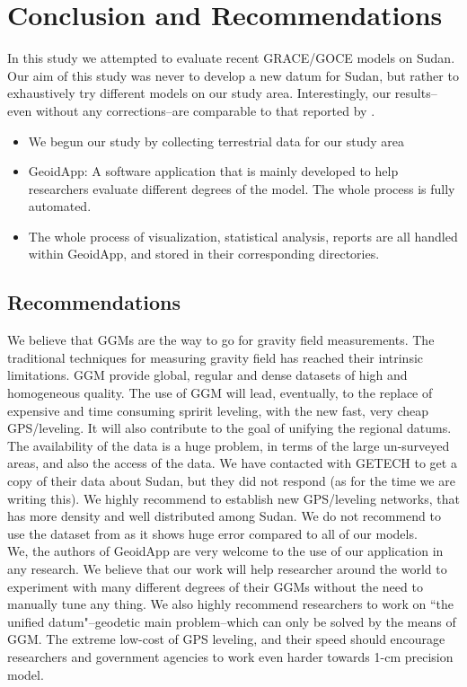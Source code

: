 \chapter{Conclusion and Recommendations}
\label{Chapter6}

In this study we attempted to evaluate recent GRACE/GOCE models on Sudan. Our aim of this study was never to develop a new datum for Sudan, but rather to exhaustively try different models on our study area. Interestingly, our results--even without any corrections--are comparable to that reported by \citep{ahmed_msc, godah}. 

\begin{itemize}
	\item We begun our study by collecting terrestrial data for our study area
	\item GeoidApp: A software application that is mainly developed to help researchers evaluate different degrees of the model. The whole process is fully automated.
	\item The whole process of visualization, statistical analysis, reports are all handled within GeoidApp, and stored in their corresponding directories.
\end{itemize}

\section{Recommendations}

We believe that GGMs are the way to go for gravity field measurements. The traditional techniques for measuring gravity field has reached their intrinsic limitations. GGM provide global, regular and dense datasets of high and homogeneous quality. The use of GGM will lead, eventually, to the replace of expensive and time consuming spririt leveling, with the new fast, very cheap GPS/leveling. It will also contribute to the goal of unifying the regional datums.
\\
The availability of the data is a huge problem, in terms of the large un-surveyed areas, and also the access of the data. We have contacted with GETECH to get a copy of their data about Sudan, but they did not respond (as for the time we are writing this). We highly recommend to establish new GPS/leveling networks, that has more density and well distributed among Sudan. We do not recommend to use the dataset from \citep{osman} as it shows huge error compared to all of our models. 
\\
We, the authors of GeoidApp are very welcome to the use of our application in any research. We believe that our work will help researcher around the world to experiment with many different degrees of their GGMs without the need to manually tune any thing. We also highly recommend researchers to work on ``the unified datum"--geodetic main problem--which can only be solved by the means of GGM. The extreme low-cost of GPS leveling, and their speed should encourage researchers and government agencies to work even harder towards 1-cm precision model. 